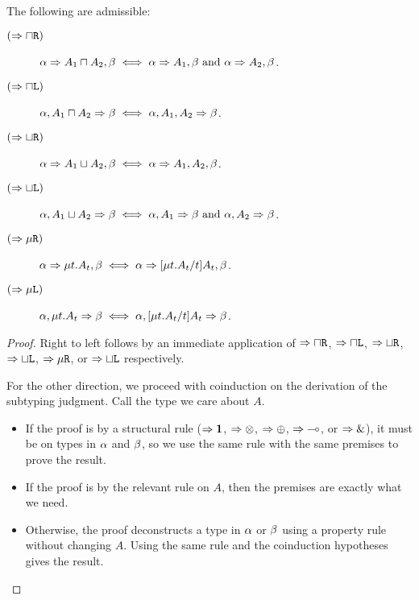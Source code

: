 \begin{lemma}[Invertibility]
  \label{refinements:subtyping-inversion}
  The following are admissible:
  \begin{description}
    \item[$(\mathrel\Rightarrow{\mathbin{\sqcap}\texttt{R}})$] $\alpha \mathrel\Rightarrow A_1 \mathbin{\sqcap} A_2, \beta \iff  \alpha \mathrel\Rightarrow A_1, \beta \text{ and } \alpha \mathrel\Rightarrow A_2, \beta$.
    \item[$(\mathrel\Rightarrow{\mathbin{\sqcap}\texttt{L}})$] $\alpha, A_1 \mathbin{\sqcap} A_2 \mathrel\Rightarrow \beta \iff \alpha, A_1, A_2 \mathrel\Rightarrow \beta$.

    \item[$(\mathrel\Rightarrow{\mathbin{\sqcup}\texttt{R}})$] $\alpha \mathrel\Rightarrow A_1 \mathbin{\sqcup} A_2, \beta \iff \alpha \mathrel\Rightarrow A_1, A_2, \beta$.
    \item[$(\mathrel\Rightarrow{\mathbin{\sqcup}\texttt{L}})$] $\alpha, A_1 \mathbin{\sqcup} A_2 \mathrel\Rightarrow \beta \iff  \alpha, A_1 \mathrel\Rightarrow \beta \text{ and } \alpha, A_2 \mathrel\Rightarrow \beta$.

    \item[$(\mathrel\Rightarrow{\mu\texttt{R}})$] $\alpha \mathrel\Rightarrow \mu{t} . {A_t}, \beta \iff \alpha \mathrel\Rightarrow \lbrack{\mu{t} . {A_t}}/{t}\rbrack{A_t}, \beta$.
    \item[$(\mathrel\Rightarrow{\mu\texttt{L}})$] $\alpha, \mu{t} . {A_t} \mathrel\Rightarrow \beta \iff \alpha, \lbrack{\mu{t} . {A_t}}/{t}\rbrack{A_t} \mathrel\Rightarrow \beta$.
  \end{description}
\end{lemma}
\begin{proof}
  Right to left follows by an immediate application of $\mathrel\Rightarrow{\mathbin{\sqcap}\texttt{R}}$, $\mathrel\Rightarrow{\mathbin{\sqcap}\texttt{L}}$, $\mathrel\Rightarrow{\mathbin{\sqcup}\texttt{R}}$, $\mathrel\Rightarrow{\mathbin{\sqcup}\texttt{L}}$, $\mathrel\Rightarrow{\mu\texttt{R}}$, or $\mathrel\Rightarrow{\mathbin{\sqcup}\texttt{L}}$ respectively.

  For the other direction, we proceed with coinduction on the derivation of the subtyping judgment. Call the type we care about $A$.
  \begin{itemize}
    \item If the proof is by a structural rule ($\mathrel\Rightarrow{\mathbf{1}}$, $\mathrel\Rightarrow{\otimes}$, $\mathrel\Rightarrow{\oplus}$, $\mathrel\Rightarrow{\multimap}$, or $\mathrel\Rightarrow{\&}$), it must be on types in $\alpha$ and $\beta$, so we use the same rule with the same premises to prove the result.
    \item If the proof is by the relevant rule on $A$, then the premises are exactly what we need.
    \item Otherwise, the proof deconstructs a type in $\alpha$ or $\beta$ using a property rule without changing $A$. Using the same rule and the coinduction hypotheses gives the result.
  \end{itemize}
\end{proof}

